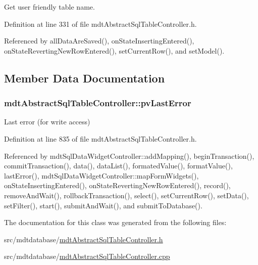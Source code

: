 Get user friendly table name. 



Definition at line 331 of file mdt\-Abstract\-Sql\-Table\-Controller.\-h.



Referenced by all\-Data\-Are\-Saved(), on\-State\-Inserting\-Entered(), on\-State\-Reverting\-New\-Row\-Entered(), set\-Current\-Row(), and set\-Model().



\subsection{Member Data Documentation}
\hypertarget{classmdt_abstract_sql_table_controller_ab84254456716151208b9e5eb3610a90b}{
\subsubsection[{pv\-Last\-Error}]{ mdt\-Abstract\-Sql\-Table\-Controller\-::pv\-Last\-Error\hspace{0.3cm}{\ttfamily [protected]}}}\label{classmdt_abstract_sql_table_controller_ab84254456716151208b9e5eb3610a90b}


Last error (for write access) 



Definition at line 835 of file mdt\-Abstract\-Sql\-Table\-Controller.\-h.



Referenced by mdt\-Sql\-Data\-Widget\-Controller\-::add\-Mapping(), begin\-Transaction(), commit\-Transaction(), data(), data\-List(), formated\-Value(), format\-Value(), last\-Error(), mdt\-Sql\-Data\-Widget\-Controller\-::map\-Form\-Widgets(), on\-State\-Inserting\-Entered(), on\-State\-Reverting\-New\-Row\-Entered(), record(), remove\-And\-Wait(), rollback\-Transaction(), select(), set\-Current\-Row(), set\-Data(), set\-Filter(), start(), submit\-And\-Wait(), and submit\-To\-Database().



The documentation for this class was generated from the following files\-:\begin{DoxyCompactItemize}
\item 
src/mdtdatabase/\hyperlink{mdt_abstract_sql_table_controller_8h}{mdt\-Abstract\-Sql\-Table\-Controller.\-h}\item 
src/mdtdatabase/\hyperlink{mdt_abstract_sql_table_controller_8cpp}{mdt\-Abstract\-Sql\-Table\-Controller.\-cpp}\end{DoxyCompactItemize}
